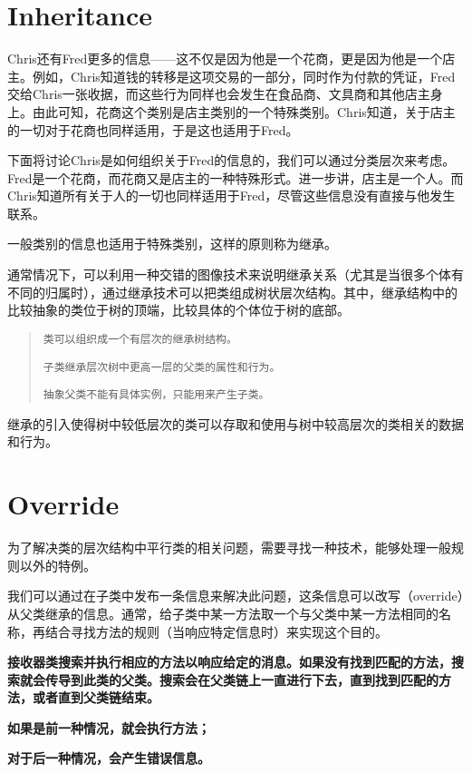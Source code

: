 \section{Inheritance}

Chris还有Fred更多的信息——这不仅是因为他是一个花商，更是因为他是一个店主。例如，Chris知道钱的转移是这项交易的一部分，同时作为付款的凭证，Fred交给Chris一张收据，而这些行为同样也会发生在食品商、文具商和其他店主身上。由此可知，花商这个类别是店主类别的一个特殊类别。Chris知道，关于店主的一切对于花商也同样适用，于是这也适用于Fred。

下面将讨论Chris是如何组织关于Fred的信息的，我们可以通过分类层次来考虑。Fred是一个花商，而花商又是店主的一种特殊形式。进一步讲，店主是一个人。而Chris知道所有关于人的一切也同样适用于Fred，尽管这些信息没有直接与他发生联系。


一般类别的信息也适用于特殊类别，这样的原则称为继承。

通常情况下，可以利用一种交错的图像技术来说明继承关系（尤其是当很多个体有不同的归属时），通过继承技术可以把类组成树状层次结构。其中，继承结构中的比较抽象的类位于树的顶端，比较具体的个体位于树的底部。

\begin{quote}
\texttt{类可以组织成一个有层次的继承树结构。}

\texttt{子类继承层次树中更高一层的父类的属性和行为。}

\texttt{抽象父类不能有具体实例，只能用来产生子类。}
\end{quote}


继承的引入使得树中较低层次的类可以存取和使用与树中较高层次的类相关的数据和行为。


\section{Override}

为了解决类的层次结构中平行类的相关问题，需要寻找一种技术，能够处理一般规则以外的特例。

我们可以通过在子类中发布一条信息来解决此问题，这条信息可以改写（override）从父类继承的信息。通常，给子类中某一方法取一个与父类中某一方法相同的名称，再结合寻找方法的规则（当响应特定信息时）来实现这个目的。

\textbf{接收器类搜索并执行相应的方法以响应给定的消息。如果没有找到匹配的方法，搜索就会传导到此类的父类。搜索会在父类链上一直进行下去，直到找到匹配的方法，或者直到父类链结束。}

\begin{compactitem}
\item \textbf{如果是前一种情况，就会执行方法；}
\item \textbf{对于后一种情况，会产生错误信息。}
\end{compactitem}

